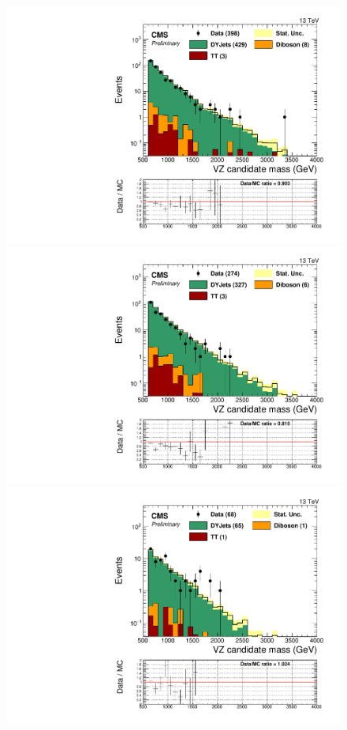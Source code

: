 \begin{figure}[h]
\begin{center}
\includegraphics[scale=0.37]{figures/control/candMassMLP.pdf}
\includegraphics[scale=0.37]{figures/control/candMassELP.pdf}\\[2cm]
\includegraphics[scale=0.37]{figures/control/candMassMHP.pdf}

\end{center}
\end{figure}
